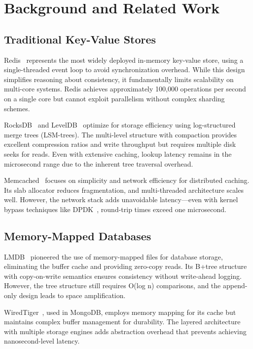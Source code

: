 \documentclass[10pt,conference]{IEEEtran}
\begin{document}
\section{Background and Related Work}
\label{sec:background}

\subsection{Traditional Key-Value Stores}

Redis~\cite{redis} represents the most widely deployed in-memory key-value store, using a single-threaded event loop to avoid synchronization overhead. While this design simplifies reasoning about consistency, it fundamentally limits scalability on multi-core systems. Redis achieves approximately 100,000 operations per second on a single core but cannot exploit parallelism without complex sharding schemes.

RocksDB~\cite{rocksdb} and LevelDB~\cite{leveldb} optimize for storage efficiency using log-structured merge trees (LSM-trees). The multi-level structure with compaction provides excellent compression ratios and write throughput but requires multiple disk seeks for reads. Even with extensive caching, lookup latency remains in the microsecond range due to the inherent tree traversal overhead.

Memcached~\cite{memcached} focuses on simplicity and network efficiency for distributed caching. Its slab allocator reduces fragmentation, and multi-threaded architecture scales well. However, the network stack adds unavoidable latency—even with kernel bypass techniques like DPDK~\cite{dpdk}, round-trip times exceed one microsecond.

\subsection{Memory-Mapped Databases}

LMDB~\cite{lmdb} pioneered the use of memory-mapped files for database storage, eliminating the buffer cache and providing zero-copy reads. Its B+tree structure with copy-on-write semantics ensures consistency without write-ahead logging. However, the tree structure still requires O(log n) comparisons, and the append-only design leads to space amplification.

WiredTiger~\cite{wiredtiger}, used in MongoDB, employs memory mapping for its cache but maintains complex buffer management for durability. The layered architecture with multiple storage engines adds abstraction overhead that prevents achieving nanosecond-level latency.
\end{document}
